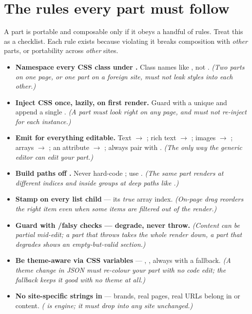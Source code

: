 \documentclass[11pt]{article}
\begin{document}
\section{The rules every part must follow}
\label{sec:rules}

A part is portable and composable only if it obeys a handful of rules. Treat this
as a checklist. Each rule exists because violating it breaks composition with
\emph{other} parts, or portability across \emph{other} sites.

\begin{itemize}[leftmargin=1.4em, itemsep=3pt]
\item[$\square$] \textbf{Namespace every CSS class under .} Class
names like , not . \emph{(Two parts on one
page, or one part on a foreign site, must not leak styles into each other.)}
\item[$\square$] \textbf{Inject CSS once, lazily, on first render.} Guard with a
unique  and append a single . \emph{(A part must look right
on any page, and must not re-inject for each instance.)}
\item[$\square$] \textbf{Emit  for everything editable.} Text
$\rightarrow$ ; rich text $\rightarrow$ ;
images $\rightarrow$ ; arrays $\rightarrow$
; an attribute $\rightarrow$ ; always
pair with . \emph{(The only way the generic editor can edit
your part.)}
\item[$\square$] \textbf{Build paths off .} Never hard-code
; use . \emph{(The same part renders at
different indices and inside groups at deep paths like
.)}
\item[$\square$] \textbf{Stamp  on every list child} ---
its \emph{true} array index. \emph{(On-page drag reorders the right item even when
some items are filtered out of the render.)}
\item[$\square$] \textbf{Guard with /falsy checks ---
degrade, never throw.} \emph{(Content can be partial mid-edit; a part that throws
takes the whole render down, a part that degrades shows an empty-but-valid
section.)}
\item[$\square$] \textbf{Be theme-aware via CSS variables} ---
, , always with a fallback.
\emph{(A theme change in JSON must re-colour your part with no code edit; the
fallback keeps it good with no theme at all.)}
\item[$\square$] \textbf{No site-specific strings in } --- brands,
real pages, real URLs belong in  or content.
\emph{( is engine; it must drop into any site unchanged.)}
\end{itemize}
\end{document}
